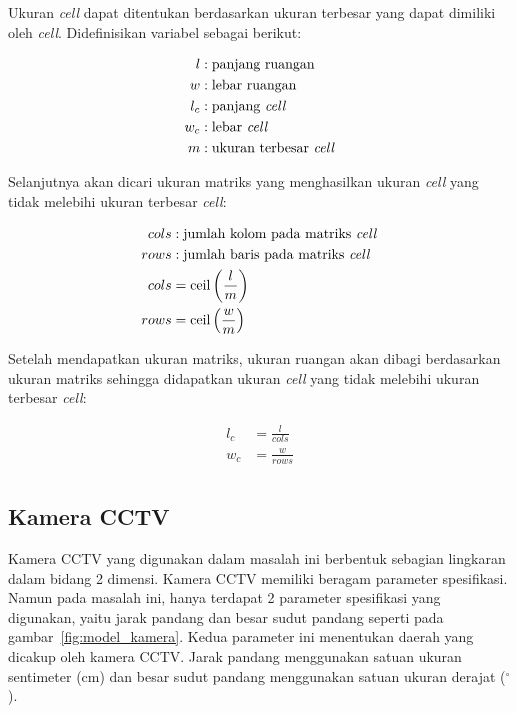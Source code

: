 Ukuran \textit{cell} dapat ditentukan berdasarkan ukuran terbesar yang dapat dimiliki oleh \textit{cell}. Didefinisikan variabel sebagai berikut:

\begin{equation}
	\begin{split}
		l &: \text{panjang ruangan}\\
		w &: \text{lebar ruangan}\\
		l_c &: \text{panjang \textit{cell}}\\
		w_c &: \text{lebar \textit{cell}}\\
		m &: \text{ukuran terbesar \textit{cell}}\\
	\end{split}
\end{equation}

Selanjutnya akan dicari ukuran matriks yang menghasilkan ukuran \textit{cell} yang tidak melebihi ukuran terbesar \textit{cell}:

\begin{equation}
	\begin{split}
		cols &: \text{jumlah kolom pada matriks \textit{cell}}\\
		rows &: \text{jumlah baris pada matriks \textit{cell}}\\
		cols &= \text{ceil}\left(\frac{l}{m}\right)\\
		rows &= \text{ceil}\left(\frac{w}{m}\right)\\
	\end{split}
\end{equation}

Setelah mendapatkan ukuran matriks, ukuran ruangan akan dibagi berdasarkan ukuran matriks sehingga didapatkan ukuran \textit{cell} yang tidak melebihi ukuran terbesar \textit{cell}:

\begin{equation}
	\begin{split}
		l_c &= \frac{l}{cols}\\
		w_c &= \frac{w}{rows}\\
	\end{split}
\end{equation}

\subsection{Kamera CCTV}
Kamera CCTV yang digunakan dalam masalah ini berbentuk sebagian lingkaran dalam bidang 2 dimensi. Kamera CCTV memiliki beragam parameter spesifikasi. Namun pada masalah ini, hanya terdapat 2 parameter spesifikasi yang digunakan, yaitu jarak pandang dan besar sudut pandang seperti pada gambar~\ref{fig:model_kamera}. Kedua parameter ini menentukan daerah yang dicakup oleh kamera CCTV. Jarak pandang menggunakan satuan ukuran sentimeter (cm) dan besar sudut pandang menggunakan satuan ukuran derajat (\(^\circ\)).

